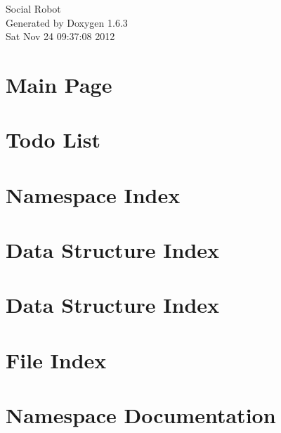 \documentclass[a4paper]{book}
\begin{document}
\hypersetup{pageanchor=false}
\begin{titlepage}
\vspace*{7cm}
\begin{center}
{\Large Social Robot }\\
\vspace*{1cm}
{\large Generated by Doxygen 1.6.3}\\
\vspace*{0.5cm}
{\small Sat Nov 24 09:37:08 2012}\\
\end{center}
\end{titlepage}
\clearemptydoublepage
{}
\tableofcontents
\clearemptydoublepage
{}
\hypersetup{pageanchor=true}
\chapter{Main Page}
\label{index}\hypertarget{index}{}
\chapter{Todo List}
\label{todo}
\hypertarget{todo}{}

\chapter{Namespace Index}

\chapter{Data Structure Index}

\chapter{Data Structure Index}

\chapter{File Index}

\chapter{Namespace Documentation}








\end{document}
